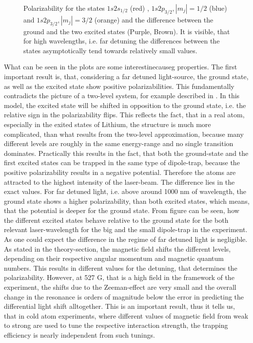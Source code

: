 \begin{figure}[H]
\caption{Polarizability \alpha for the states $1s2s_{1/2}$ (red) , $1s2p_{3/2}, |m_j|=1/2$ (blue) and  $1s2p_{3/2}, |m_j|=3/2$ (orange) and the difference between the ground and the two excited states (Purple, Brown). It is visible, that for high wavelengths, i.e. far detuning the differences between the states asymptotically tend towards relatively small values.}
\label{alphages}
\end{figure}
What can be seen in the plots are some interestinecauseg properties. The first important result is, that, considering a far detuned light-source, the ground state, as well as the excited state show positive polarizabilities. This fundamentally contradicts the picture of a two-level system, for example described in \cite{cohen}. In this model, the excited state will be shifted in opposition to the ground state, i.e. the relative sign in the polarizability flips. This reflects the fact, that in a real atom, especially in the exited states of Lithium, the structure is much more complicated, than what results from the two-level approximation, because many different levels are roughly in the same energy-range and no single transition dominates. Practically this results in the fact, that both the ground-state and the first excited states can be trapped in the same type of dipole-trap, because the positive polarizability results in a negative potential. Therefore the atoms are attracted to the highest intensity of the laser-beam. The difference lies in the exact values. For far detuned light, i.e. above around 1000 nm of wavelength, the ground state shows a higher polarizability, than both excited states, which means, that the potential is deeper for the ground state. From figure \label{relativealpha} can be seen, how the different excited states behave relative to the ground state for the both relevant laser-wavelength for the big and the small dipole-trap in the experiment. As one could expect the difference in the regime of far detuned light is negligible. As stated in the theory-section, the magnetic field shifts the different levels, depending on their respective angular momentum and magnetic quantum numbers. This results in different values for the detuning, that determines the polarizability. However, at 527 G, that is a high field in the framework of the experiment, the shifts due to the Zeeman-effect are very small and the overall change in the resonance is orders of magnitude below the error in predicting the differential light shift alltogether. This is an important result, thus it tells us, that in cold atom experiments, where different values of magnetic field from weak to strong are used to tune the respective interaction strength, the trapping efficiency is nearly independent from such tunings.

